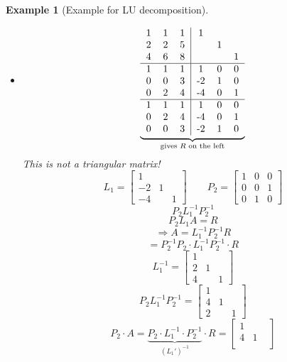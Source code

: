 \documentclass[a4paper,landscape,twocolumn]{article}
\newtheorem{ex}{Example}
\begin{document}
\begin{ex}[Example for LU decomposition]
\begin{itemize}
    \item
      \[
        \underbrace{\begin{tabular}{ccc|ccc}
          1 & 1 & 1 & 1 &   & \\
          2 & 2 & 5 &   & 1 & \\
          4 & 6 & 8 &   &   & 1 \\
        \hline
          1 & 1 & 1 & 1 & 0 & 0 \\
          0 & 0 & 3 & -2 & 1 & 0 \\
          0 & 2 & 4 & -4 & 0 & 1 \\
        \hline
          1 & 1 & 1 & 1 & 0 & 0 \\
          0 & 2 & 4 & -4 & 0 & 1 \\
          0 & 0 & 3 & -2 & 1 & 0
        \end{tabular}}_{\text{gives } R \text{ on the left}}
      \]
      This is not a triangular matrix!
      \[
        L_1 = \begin{bmatrix}
           1 &   & \\
          -2 & 1 &  \\
          -4 &   & 1
        \end{bmatrix}
        \qquad
        P_2 = \begin{bmatrix}
          1 & 0 & 0 \\
          0 & 0 & 1 \\
          0 & 1 & 0
        \end{bmatrix}
      \] \[
        P_2 L_1^{-1} P_2^{-1}
      \] \[
        P_2 L_1 A = R
      \] \[
        \Rightarrow A = L_1^{-1} P_2^{-1} R
      \] \[
        = P_2^{-1} P_2 \cdot L_1^{-1} P_2^{-1} \cdot R
      \]
      \[
        L_1^{-1} = \begin{bmatrix}
          1 &   & \\
          2 & 1 & \\
          4 &   & 1
        \end{bmatrix}
      \] \[
        P_2 L_1^{-1} P_2^{-1} = \begin{bmatrix}
          1 &   & \\
          4 & 1 & \\
          2 &   & 1
        \end{bmatrix}
      \] \[
        P_2 \cdot A = \underbrace{P_2 \cdot L_1^{-1} \cdot P_2^{-1}}_{(L_1')^{-1}} \cdot R
          = \begin{bmatrix}
            1 &   & \\
            4 & 1 & \\

\end{bmatrix}\]
\end{itemize}
\end{ex}
\end{document}
